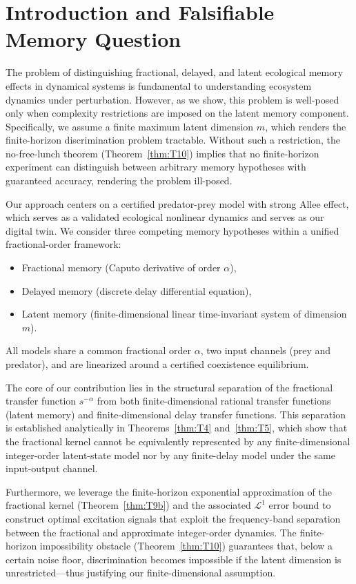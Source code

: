 \section{Introduction and Falsifiable Memory Question}
\label{sec:introduction}

The problem of distinguishing fractional, delayed, and latent ecological memory effects in dynamical systems is fundamental to understanding ecosystem dynamics under perturbation.
However, as we show, this problem is well-posed only when complexity restrictions are imposed on the latent memory component.
Specifically, we assume a finite maximum latent dimension $m$, which renders the finite-horizon discrimination problem tractable.
Without such a restriction, the no-free-lunch theorem (Theorem~\ref{thm:T10}) implies that no finite-horizon experiment can distinguish between arbitrary memory hypotheses with guaranteed accuracy, rendering the problem ill-posed.

Our approach centers on a certified predator-prey model with strong Allee effect, which serves as a validated ecological nonlinear dynamics and serves as our digital twin.
We consider three competing memory hypotheses within a unified fractional-order framework:
\begin{itemize}
    \item Fractional memory (Caputo derivative of order $\alpha$),
    \item Delayed memory (discrete delay differential equation),
    \item Latent memory (finite-dimensional linear time-invariant system of dimension $m$).
\end{itemize}
All models share a common fractional order $\alpha$, two input channels (prey and predator), and are linearized around a certified coexistence equilibrium.

The core of our contribution lies in the structural separation of the fractional transfer function $s^{-\alpha}$ from both finite-dimensional rational transfer functions (latent memory) and finite-dimensional delay transfer functions.
This separation is established analytically in Theorems~\ref{thm:T4} and~\ref{thm:T5}, which show that the fractional kernel cannot be equivalently represented by any finite-dimensional integer-order latent-state model nor by any finite-delay model under the same input-output channel.

Furthermore, we leverage the finite-horizon exponential approximation of the fractional kernel (Theorem~\ref{thm:T9b}) and the associated $\mathcal{L}^1$ error bound to construct optimal excitation signals that exploit the frequency-band separation between the fractional and approximate integer-order dynamics.
The finite-horizon impossibility obstacle (Theorem~\ref{thm:T10}) guarantees that, below a certain noise floor, discrimination becomes impossible if the latent dimension is unrestricted—thus justifying our finite-dimensional assumption.

